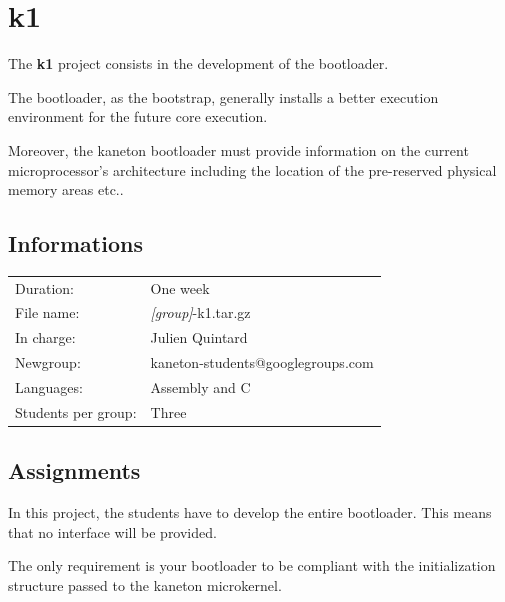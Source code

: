 
%
%

\chapter{k1}

The \textbf{k1} project consists in the development of the bootloader.

The bootloader, as the bootstrap, generally installs a better execution
environment for the future core execution.

Moreover, the kaneton bootloader must provide information on the current
microprocessor's architecture including the location of the pre-reserved
physical memory areas etc..

\newpage

%
%

\section{Informations}

\begin{tabular}{p{7cm}l}
Duration: & One week \\
File name: & \textit{[group]}-k1.tar.gz \\
In charge: & Julien Quintard \\
Newgroup: & kaneton-students@googlegroups.com \\
Languages: & Assembly and C \\
Students per group: & Three \\
\end{tabular}

%
%

\section{Assignments}

In this project, the students have to develop the entire bootloader.
This means that no interface will be provided.

The only requirement is your bootloader to be compliant with the
initialization structure passed to the kaneton microkernel.

